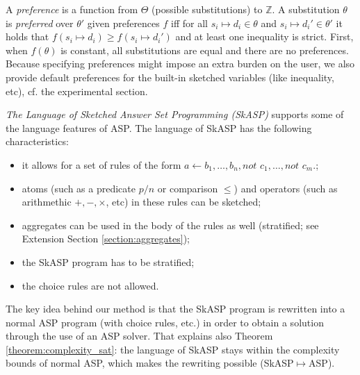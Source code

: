 A \textit{preference} is a function from $\Theta$ (possible substitutions) to $\mathbb{Z}$. A substitution $\theta$ is \textit{preferred} over $\theta'$ given preferences $f$ iff for all $s_i \mapsto d_i \in \theta$ and $s_{i} \mapsto d_{i}' \in \theta'$ it holds that $f(s_i \mapsto d_i) \geq f(s_i \mapsto d_{i}')$ and at least one inequality is strict. First, when $f(\theta)$ is constant,
all substitutions are equal and there are no preferences. Because specifying preferences might impose an extra burden on the user, we also provide default preferences for the built-in sketched variables (like inequality, etc), cf. the experimental section.

\textit{The Language of Sketched Answer Set Programming (SkASP)}
supports some of the language features of ASP. 
The language of SkASP has the following characteristics:

\begin{itemize}
\item it allows for a set of rules of the form $a \leftarrow b_1, \dots, b_n, \textit{not }c_1, \dots, \textit{not }c_m.$;
\item atoms (such as a predicate $p/n$ or comparison $\leq$) and operators (such as arithmethic $+,-,\times$, etc) in these rules can be sketched; 
\item aggregates can be used in the body of the rules as well (stratified; see Extension Section \ref{section:aggregates});
\item the SkASP program has to be stratified; 
\item the choice rules are not allowed.
\end{itemize}

The key idea behind our method is that the SkASP program is rewritten into a normal ASP program (with choice rules, etc.) in order to obtain a solution through the use of an ASP solver.
That explains also Theorem \ref{theorem:complexity_sat}: the language of SkASP stays within the complexity bounds of normal ASP, which makes the rewriting possible (SkASP$\mapsto$ASP).

